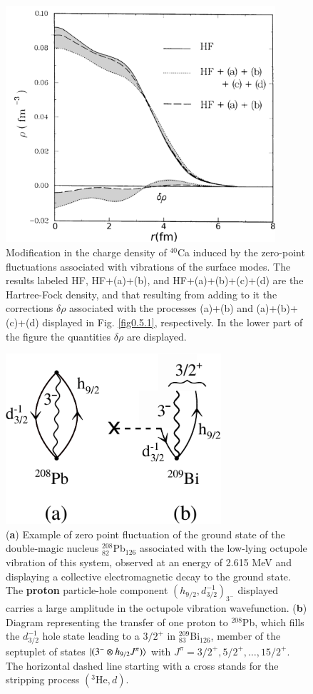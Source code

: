 \begin{figure}
	\centerline {
		\includegraphics*[width=10cm, angle=0.]{introduccion/figs/fig0_8_2}
	}
	\caption{Modification in the charge density of $^{40}$Ca induced by the zero-point fluctuations associated with vibrations of the surface modes. The results labeled HF, HF+(a)+(b), and HF+(a)+(b)+(c)+(d) are the Hartree-Fock density, and that resulting from adding to it the corrections $\delta\rho$ associated with the processes (a)+(b) and (a)+(b)+(c)+(d) displayed in Fig. \ref{fig0.5.1}, respectively. In the lower part of the figure the  quantities $\delta\rho$ are displayed.}
	\label{fig0.5.2}
\end{figure}
\begin{figure}
	\centerline {
		\includegraphics*[width=8cm, angle=0.]{introduccion/figs/fig0_5_3}
	}
	\caption{(\textbf{a}) Example of zero point fluctuation of the ground state of the double-magic nucleus $^{208}_{82}$Pb$_{126}$ associated with the low-lying octupole vibration of this system, observed at an energy of 2.615 MeV and displaying a collective electromagnetic decay to the ground state. The \textbf{proton} particle-hole component $(h_{9/2},d^{-1}_{3/2})_{3^-}$ displayed carries a large amplitude in the octupole vibration wavefunction. (\textbf{b}) Diagram representing the transfer of one proton to $^{208}$Pb, which fills the $d_{3/2}^{-1}$ hole state leading to a $3/2^+$ in $^{209}_{83}$Bi$_{126}$, member of the septuplet of states $|{(3^-\otimes h_{9/2}J^\pi)} \rangle$ with $J^\pi=3/2^+,5/2^+,\dots,15/2^+$. The horizontal dashed line starting with a cross stands for the stripping process $(^3\text{He},d)$.}
	\label{fig0.5.3}
\end{figure}
